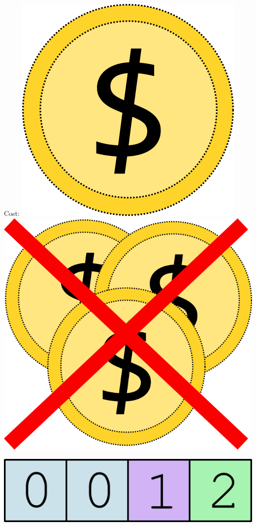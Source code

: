 \documentclass[aspectratio=169]{beamer}
\begin{document}
\begin{frame}[fragile]
    \hspace{10em} Cost:
    \includegraphics[height=.15\textheight]{amortizedgfx/coin_01.png}
    \hspace{1.5em}
    \includegraphics[height=.15\textheight]{amortizedgfx/coin_no_03.png}
    
    \begin{center}
      \includegraphics[width=.5\textwidth]{amortizedgfx/push_002.png}
    \end{center}
    
\end{frame}
\end{document}
